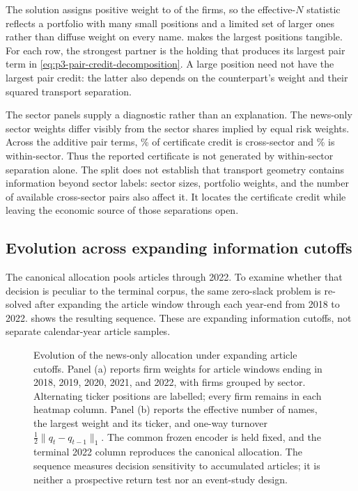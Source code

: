 The solution assigns positive weight to
 of the  firms, so the
effective-$N$ statistic reflects a portfolio with many small positions and a
limited set of larger ones rather than diffuse weight on every name.
 makes the largest positions tangible.
For each row, the strongest partner is the holding that produces its largest
pair term in \eqref{eq:p3-pair-credit-decomposition}.
A large position need not have the largest pair credit: the latter also
depends on the counterpart's weight and their squared transport separation.



The sector panels supply a diagnostic rather than an explanation.
The news-only sector weights differ visibly from the sector shares implied by
equal risk weights.
Across the additive pair terms,
\% of certificate credit is
cross-sector and \% is
within-sector.
Thus the reported certificate is not generated by within-sector separation
alone.
The split does not establish that transport geometry contains information
beyond sector labels: sector sizes, portfolio weights, and the number of
available cross-sector pairs also affect it.
It locates the certificate credit while leaving the economic source of those
separations open.

\subsection{Evolution across expanding information cutoffs}
\label{sec:p3-portfolio-evolution}

The canonical allocation pools articles through 2022.
To examine whether that decision is peculiar to the terminal corpus, the same
zero-slack problem is re-solved after expanding the article window through
each year-end from 2018 to 2022.
 shows the resulting sequence.
These are expanding information cutoffs, not separate calendar-year article
samples.

\begin{figure}[H]
  \centering
  \caption{Evolution of the news-only allocation under expanding
    article cutoffs. Panel (a) reports firm weights for article windows ending
    in 2018, 2019, 2020, 2021, and 2022, with firms grouped by sector.
    Alternating ticker positions are labelled; every firm remains in each
    heatmap column.
    Panel (b) reports the effective number of names, the largest weight and its
    ticker, and one-way turnover
    $\tfrac12\lVert q_t-q_{t-1}\rVert_1$. The common frozen encoder is held
    fixed, and the terminal 2022 column reproduces the canonical allocation.
    The sequence measures decision sensitivity to accumulated articles; it is
  neither a prospective return test nor an event-study design.}
  \label{fig:p3-portfolio-evolution}
\end{figure}

